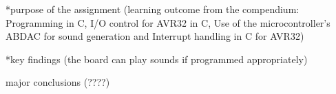 *purpose of the assignment (learning outcome from the compendium: Programming in C, I/O control for AVR32 in C, Use of the microcontroller's ABDAC for sound generation and Interrupt handling in C for AVR32)

*key findings (the board can play sounds if programmed appropriately)

major conclusions (????)